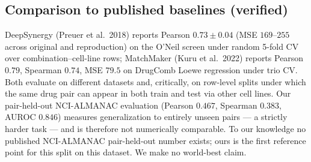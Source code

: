\documentclass[11pt]{article}
\begin{document}
\subsection{Comparison to published baselines (verified)}
DeepSynergy (Preuer et al.\ 2018) reports Pearson $0.73\pm0.04$ (MSE $169$--$255$ across original and reproduction) on the O'Neil screen under random 5-fold CV over combination--cell-line rows; MatchMaker (Kuru et al.\ 2022) reports Pearson $0.79$, Spearman $0.74$, MSE $79.5$ on DrugComb Loewe regression under trio CV. Both evaluate on different datasets and, critically, on row-level splits under which the same drug pair can appear in both train and test via other cell lines. Our pair-held-out NCI-ALMANAC evaluation (Pearson $0.467$, Spearman $0.383$, AUROC $0.846$) measures generalization to entirely unseen pairs --- a strictly harder task --- and is therefore not numerically comparable. To our knowledge no published NCI-ALMANAC pair-held-out number exists; ours is the first reference point for this split on this dataset. We make no world-best claim.
\end{document}
